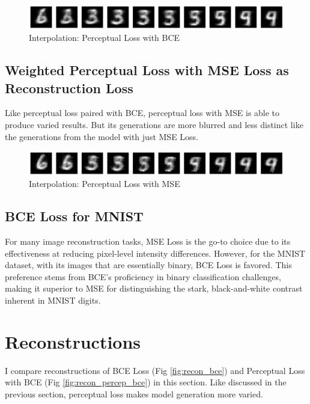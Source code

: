 \documentclass[12pt]{article}
\begin{document}
\begin{figure}[h]
\centering
\includegraphics[width=1\linewidth]{report_images/percep_bce/interpolation.png}
\caption{\label{fig:inter_percep_bce}Interpolation: Perceptual Loss with BCE}
\end{figure}

\subsection{Weighted Perceptual Loss with MSE Loss as Reconstruction Loss}
Like perceptual loss paired with BCE, perceptual loss with MSE is able to produce varied results. But its generations are more blurred and less distinct like the generations from the model with just MSE Loss.

\begin{figure}[h]
\centering
\includegraphics[width=1\linewidth]{report_images/percep_mse/interpolation.png}
\caption{\label{fig:inter_percep_mse}Interpolation: Perceptual Loss with MSE}
\end{figure}

\subsection{BCE Loss for MNIST}
For many image reconstruction tasks, MSE Loss is the go-to choice due to its effectiveness at reducing pixel-level intensity differences. However, for the MNIST dataset, with its images that are essentially binary, BCE Loss is favored. This preference stems from BCE's proficiency in binary classification challenges, making it superior to MSE for distinguishing the stark, black-and-white contrast inherent in MNIST digits.


\section{Reconstructions}
I compare reconstructions of BCE Loss (Fig \ref{fig:recon_bce}) and Perceptual Loss with BCE (Fig \ref{fig:recon_percep_bce}) in this section. Like discussed in the previous section, perceptual loss makes model generation more varied. 
\end{document}
